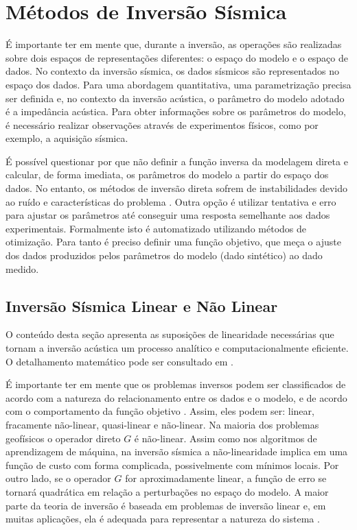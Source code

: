 \section{Métodos de Inversão Sísmica}
É importante ter em mente que, durante a inversão, as operações são realizadas
sobre dois espaços de representações diferentes: o espaço do modelo e o espaço de dados.
No contexto da inversão sísmica, os dados sísmicos são representados no espaço
dos dados. Para uma abordagem quantitativa, uma parametrização precisa ser definida \citep{tarantola} e,
no contexto da inversão acústica, o parâmetro do modelo adotado é a impedância acústica.
Para obter informações sobre os parâmetros do modelo, é necessário
realizar observações através de experimentos físicos, como por exemplo, a
aquisição sísmica.

É possível questionar por que não definir a
função inversa da modelagem direta e calcular, de forma imediata,
os parâmetros do modelo a partir do espaço dos dados.
No entanto, os métodos de inversão direta sofrem de instabilidades
devido ao ruído e características do problema \citep[p. 50]{sen_livro}. Outra
opção é utilizar tentativa e erro para ajustar os parâmetros até conseguir uma
resposta semelhante aos dados experimentais. Formalmente isto é automatizado
utilizando métodos de otimização. Para tanto é preciso definir uma função
objetivo, que meça o ajuste dos dados produzidos pelos
parâmetros do modelo (dado sintético) ao dado medido.

\subsection{Inversão Sísmica Linear e Não Linear}
O conteúdo desta seção apresenta as suposições de linearidade necessárias
que tornam a inversão acústica um processo analítico e computacionalmente
eficiente. O detalhamento matemático pode ser consultado em \cite{leandroGRSL,Figueiredo17}.

É importante ter em mente
que os problemas inversos podem ser classificados de acordo com a natureza
do relacionamento entre os dados e o modelo, e de acordo com o comportamento da função objetivo \citep{sen_livro}.
Assim, eles podem ser: linear, fracamente não-linear, quasi-linear e não-linear.
Na maioria dos problemas geofísicos o operador direto $G$ é não-linear.
Assim como nos algoritmos de aprendizagem de máquina, na inversão sísmica
a não-linearidade implica em uma função de custo com forma complicada,
possivelmente com mínimos locais.
Por outro lado, se o operador $G$ for aproximadamente linear, a
função de erro se tornará quadrática em relação a perturbações
no espaço do modelo. A maior parte da teoria de inversão é baseada em problemas
de inversão linear e, em muitas aplicações, ela é 
adequada para representar a natureza do sistema \cite{sen_livro}.

